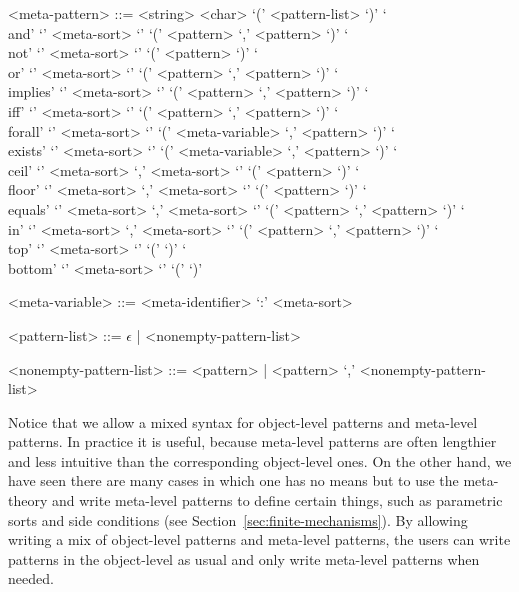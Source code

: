 \documentclass[UTF8,11pt]{article}
\theoremstyle{plain}
\theoremstyle{definition}
\theoremstyle{remark}
\DeclarePairedDelimiter{\ceil}{\lceil}{\rceil}
\DeclarePairedDelimiter{\floor}{\lfloor}{\rfloor}
\begin{document}
\begin{grammar}
 <meta-pattern> ::= \quad
    \alt <string>
    \alt <char>
  `(' <pattern-list> `)'
 \alt `\\and' `{' <meta-sort> `}'
 `(' <pattern> `,' <pattern> `)'
 \alt `\\not' `{' <meta-sort> `}'
 `(' <pattern> `)'
 \alt `\\or' `{' <meta-sort> `}'
 `(' <pattern> `,' <pattern> `)'
 \alt `\\implies' `{' <meta-sort> `}'
 `(' <pattern> `,' <pattern> `)'
 \alt `\\iff' `{' <meta-sort> `}'
 `(' <pattern> `,' <pattern> `)'
 \alt `\\forall' `{' <meta-sort> `}'
 `(' <meta-variable> `,' <pattern> `)'
 \alt `\\exists' `{' <meta-sort> `}'
 `(' <meta-variable> `,' <pattern> `)'
 \alt `\\ceil' `{' <meta-sort> `,' <meta-sort> `}'
 `(' <pattern> `)'
 \alt `\\floor' `{' <meta-sort> `,' <meta-sort> `}'
 `(' <pattern> `)'
 \alt `\\equals' `{' <meta-sort> `,' <meta-sort> `}'
 `(' <pattern> `,' <pattern> `)'
 \alt `\\in' `{' <meta-sort> `,' <meta-sort> `}'
 `(' <pattern> `,' <pattern> `)'
 \alt `\\top' `{' <meta-sort> `}' `(' `)'
 \alt `\\bottom' `{' <meta-sort> `}' `(' `)'
 
 <meta-variable> ::= <meta-identifier> `:' <meta-sort>
 
 <pattern-list> ::= $\epsilon$ | <nonempty-pattern-list>
 
 <nonempty-pattern-list> ::= <pattern> | <pattern> `,'
 <nonempty-pattern-list>
\end{grammar}
Notice that we allow a mixed syntax for object-level patterns and meta-level
patterns.
In practice it is useful, because meta-level patterns are often lengthier and
less intuitive than the corresponding object-level ones.
On the other hand, we have seen there are many cases in which one has no means
but to use the meta-theory and write meta-level patterns to define certain
things, such as parametric sorts and side conditions (see
Section~\ref{sec:finite-mechanisms}).
By allowing writing a mix of object-level patterns and meta-level patterns, the
users can write patterns in the object-level as usual and only write meta-level
patterns when needed.
\end{document}
